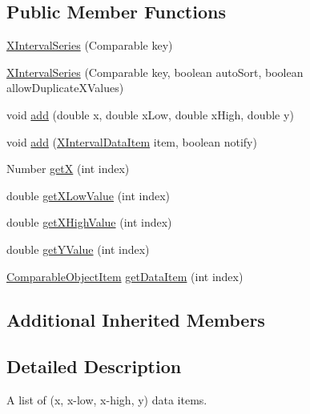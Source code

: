 \subsection*{Public Member Functions}
\begin{DoxyCompactItemize}
\item 
\mbox{\hyperlink{classorg_1_1jfree_1_1data_1_1xy_1_1_x_interval_series_a9434fec432a254da18b8d9c3543d5d17}{X\+Interval\+Series}} (Comparable key)
\item 
\mbox{\hyperlink{classorg_1_1jfree_1_1data_1_1xy_1_1_x_interval_series_a3f8eeebda6207bba7c6e3e267fa8b2e0}{X\+Interval\+Series}} (Comparable key, boolean auto\+Sort, boolean allow\+Duplicate\+X\+Values)
\item 
void \mbox{\hyperlink{classorg_1_1jfree_1_1data_1_1xy_1_1_x_interval_series_a4a388b4a48e471120d79ae7ccd1da2cd}{add}} (double x, double x\+Low, double x\+High, double y)
\item 
void \mbox{\hyperlink{classorg_1_1jfree_1_1data_1_1xy_1_1_x_interval_series_a02a666381e2899b9c6618810b34e210b}{add}} (\mbox{\hyperlink{classorg_1_1jfree_1_1data_1_1xy_1_1_x_interval_data_item}{X\+Interval\+Data\+Item}} item, boolean notify)
\item 
Number \mbox{\hyperlink{classorg_1_1jfree_1_1data_1_1xy_1_1_x_interval_series_ab8858df46004e2277aa4a4eb55e7cc93}{getX}} (int index)
\item 
double \mbox{\hyperlink{classorg_1_1jfree_1_1data_1_1xy_1_1_x_interval_series_a61bbfd5c788186e1f6eebb71308a4e67}{get\+X\+Low\+Value}} (int index)
\item 
double \mbox{\hyperlink{classorg_1_1jfree_1_1data_1_1xy_1_1_x_interval_series_a0ee012b69f57b957bfa56048d9588094}{get\+X\+High\+Value}} (int index)
\item 
double \mbox{\hyperlink{classorg_1_1jfree_1_1data_1_1xy_1_1_x_interval_series_adc6aea4f89528bf3e77c637fb95b5d01}{get\+Y\+Value}} (int index)
\item 
\mbox{\hyperlink{classorg_1_1jfree_1_1data_1_1_comparable_object_item}{Comparable\+Object\+Item}} \mbox{\hyperlink{classorg_1_1jfree_1_1data_1_1xy_1_1_x_interval_series_afbf68a828b94840e8c9cbf1c3d97ceed}{get\+Data\+Item}} (int index)
\end{DoxyCompactItemize}
\subsection*{Additional Inherited Members}


\subsection{Detailed Description}
A list of (x, x-\/low, x-\/high, y) data items.

